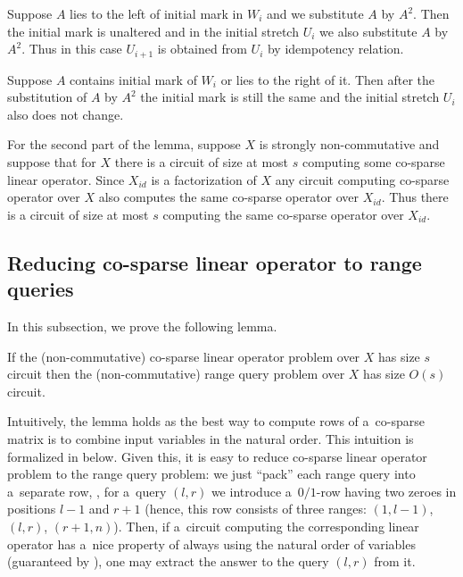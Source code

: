 \documentclass{toc}
\begin{document}
Suppose $A$ lies to the left of initial mark in $W_i$ and we substitute $A$ by $A^2$. Then the initial mark is unaltered and in the 
initial stretch %
$U_i$ we also substitute $A$ by $A^2$. Thus in this case $U_{i+1}$ is obtained from $U_i$ by idempotency relation.

Suppose $A$ contains initial mark of $W_i$ or lies to the right of it. Then after the substitution of $A$ by $A^2$ the initial mark is still the same and the 
initial stretch %
$U_i$ also does not change.


For the second part of the lemma, suppose $X$ is strongly non-commutative and suppose that for $X$ there is a circuit of size at most $s$ computing some
co-sparse
 linear operator.
Since $X_{id}$ is a factorization of $X$ any circuit computing
co-sparse
operator over $X$ also computes the same
co-sparse
operator over $X_{id}$. Thus there is a  circuit of size at most $s$ computing the same
co-sparse
operator over $X_{id}$.

\subsection{Reducing
    co-sparse
    linear operator to range queries} \label{sec:operators_to_queries}
In this subsection, we prove the following lemma.

\begin{lemma} \label{lem:dense_matrices}
    If the (non-commutative)
    co-sparse
    linear operator problem over $X$ has size $s$
    circuit then the (non-commutative)
    range query
    problem over $X$ has size
    $O(s)$ circuit.
\end{lemma}

Intuitively, the lemma holds as the best way to compute rows of
a~co-sparse
matrix is to combine input variables in the natural order. This intuition is formalized in  below. Given this, it is easy to reduce
co-sparse
linear operator problem to the
range query
problem: we just ``pack'' each range query into a~separate row, \ie, for a~query $(l,r)$ we introduce a~$0/1$-row having two zeroes in positions $l-1$ and $r+1$ (hence, this row consists of three ranges: $(1,l-1)$, $(l,r)$, $(r+1,n)$). Then, if a~circuit computing the corresponding linear operator has a~nice property of always using the natural order of variables (guaranteed by ), one may extract the answer to the query $(l,r)$ from it.
\end{document}
